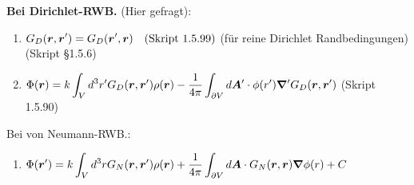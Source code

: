 \begin{enumerate}
        \textbf{Bei Dirichlet-RWB.} (Hier gefragt):
        \begin{center}
        \begin{enumerate}
          \item $\displaystyle G_D(\vb* r, \vb* r')= G_D(\vb* r', \vb* r)
            \quad\text{(Skript 1.5.99)}$ 
          (für reine Dirichlet Randbedingungen) (Skript §1.5.6)\\
        \item $\displaystyle \Phi(\vb* r)=k\int_V d^3r' G_D(\vb* r, \vb* r')\rho(\vb* r)
           -\frac{1}{4\pi}\int_{\partial V}d\vb* A'\cdot\phi(r')
           \grad' G_D(\vb* r, \vb* r')$ (Skript 1.5.90)\\
        \end{enumerate}
        \end{center}
        Bei von Neumann-RWB.:
        \begin{enumerate}
          \item $\displaystyle \Phi(\vb* r')=
            k\int_V d^3r G_N(\vb* r,\vb* r')\rho(\vb* r)
            +\frac{1}{4\pi} \int_{\partial V} d\vb* A \cdot 
            G_N(\vb* r,\vb* r)\grad\phi(r) + C$
        \end{enumerate}
\end{enumerate}
